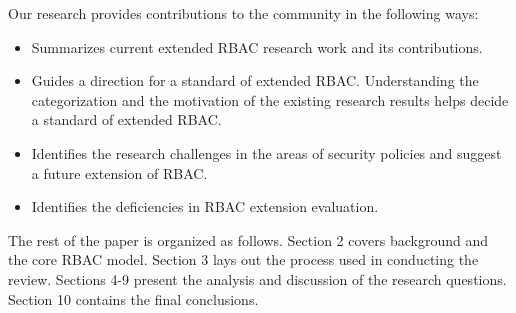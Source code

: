 Our research provides contributions to the community in the following ways:

\begin{itemize}
\setlength{\itemsep}{0.25pt}
\item Summarizes current extended RBAC research work and its contributions.
\item Guides a direction for a standard of extended RBAC. Understanding the categorization and the motivation of the existing research results helps decide a standard of extended RBAC.
\item Identifies the research challenges in the areas of security policies and suggest a future extension of RBAC.
\item Identifies the deficiencies in RBAC extension evaluation.
\end{itemize}

The rest of the paper is organized as follows.  Section 2 covers background and the core RBAC model. Section 3 lays out the process used in conducting the review. Sections 4-9 present the analysis and discussion of the research questions. Section 10 contains the final conclusions.
